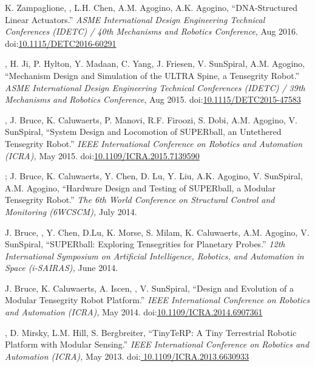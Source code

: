 \documentclass[letterpaper]{deedy-resume} %
\newcommand\doilink[1]{\href{http://dx.doi.org/#1}{#1}}
\newcommand\doi[1]{doi:\doilink{#1}}
\begin{document}
{\begin{etaremune}[itemsep=0.1cm]
\item K. Zampaglione, \underline{{}}, L.H. Chen, A.M. Agogino,  A.K. Agogino, ``DNA-Structured Linear Actuators.'' {\it ASME International Design Engineering Technical Conferences (IDETC) / 40th Mechanisms and Robotics Conference}, Aug 2016. \doi{10.1115/DETC2016-60291}
  
\item \underline{{}}, H. Ji, P. Hylton, Y. Madaan, C. Yang, J. Friesen, V. SunSpiral, A.M. Agogino, ``Mechanism Design and Simulation of the ULTRA Spine, a Tensegrity Robot.'' {\it ASME International Design Engineering Technical Conferences (IDETC) / 39th Mechanisms and Robotics Conference}, Aug 2015. \doi{10.1115/DETC2015-47583}

\item \underline{{}}, J. Bruce, K. Caluwaerts, P. Manovi, R.F. Firoozi, S. Dobi, A.M. Agogino, V. SunSpiral, ``System Design and Locomotion of SUPERball, an Untethered Tensegrity Robot.'' {\it IEEE International Conference on Robotics and Automation (ICRA),} May 2015. \doi{10.1109/ICRA.2015.7139590}

\item \underline{{}}; J. Bruce, K. Caluwaerts, Y. Chen, D. Lu, Y. Liu, A.K. Agogino, V. SunSpiral, A.M. Agogino, ``Hardware Design and Testing of SUPERball, a Modular Tensegrity Robot.'' {\it The 6th World Conference on Structural Control and Monitoring (6WCSCM),} July 2014.

\item J. Bruce, \underline{{}}, Y. Chen, D.Lu, K. Morse, S. Milam, K. Caluwaerts, A.M. Agogino, V. SunSpiral, ``SUPERball: Exploring Tensegrities for Planetary Probes.'' {\it 12th International Symposium on Artificial Intelligence, Robotics, and Automation in Space (i-SAIRAS),} June 2014.

\item J. Bruce, K. Caluwaerts, A. Iscen, \underline{{}}, V. SunSpiral, ``Design and Evolution of a Modular Tensegrity Robot Platform.'' {\it IEEE International Conference on Robotics and Automation (ICRA),} May 2014. \doi{10.1109/ICRA.2014.6907361}

\item \underline{{}}, D. Mirsky, L.M. Hill, S. Bergbreiter, ``TinyTeRP: A Tiny Terrestrial Robotic Platform with Modular Sensing.'' {\it IEEE International Conference on Robotics and Automation (ICRA),} May 2013. \doi{ 10.1109/ICRA.2013.6630933}


\end{etaremune}}
\end{document}
